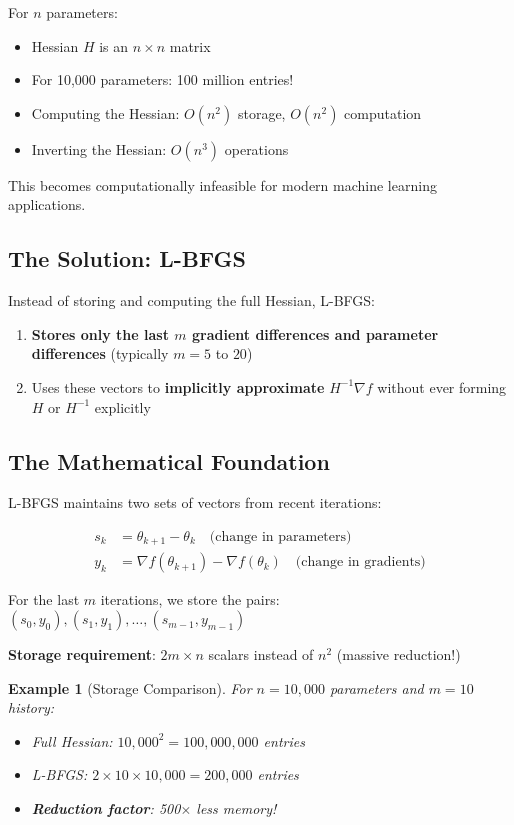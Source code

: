 \documentclass[11pt, a4paper, oneside]{article}
\newtheorem{example}[theorem]{Example}
\begin{document}
For $n$ parameters:
\begin{itemize}
    \item Hessian $H$ is an $n \times n$ matrix
    \item For 10,000 parameters: 100 million entries!
    \item Computing the Hessian: $O(n^2)$ storage, $O(n^2)$ computation
    \item Inverting the Hessian: $O(n^3)$ operations
\end{itemize}

This becomes computationally infeasible for modern machine learning applications.

\subsection{The Solution: L-BFGS}

Instead of storing and computing the full Hessian, L-BFGS:

\begin{enumerate}
    \item \textbf{Stores only the last $m$ gradient differences and parameter differences} (typically $m = 5$ to $20$)
    \item Uses these vectors to \textbf{implicitly approximate} $H^{-1} \nabla f$ without ever forming $H$ or $H^{-1}$ explicitly
\end{enumerate}

\subsection{The Mathematical Foundation}

L-BFGS maintains two sets of vectors from recent iterations:

\begin{align}
s_k &= \theta_{k+1} - \theta_k \quad \text{(change in parameters)} \\
y_k &= \nabla f(\theta_{k+1}) - \nabla f(\theta_k) \quad \text{(change in gradients)}
\end{align}

For the last $m$ iterations, we store the pairs: $(s_0, y_0), (s_1, y_1), \ldots, (s_{m-1}, y_{m-1})$

\textbf{Storage requirement}: $2m \times n$ scalars instead of $n^2$ (massive reduction!)

\begin{example}[Storage Comparison]
For $n = 10{,}000$ parameters and $m = 10$ history:
\begin{itemize}
    \item Full Hessian: $10{,}000^2 = 100{,}000{,}000$ entries
    \item L-BFGS: $2 \times 10 \times 10{,}000 = 200{,}000$ entries
    \item \textbf{Reduction factor}: 500$\times$ less memory!
\end{itemize}
\end{example}
\end{document}
